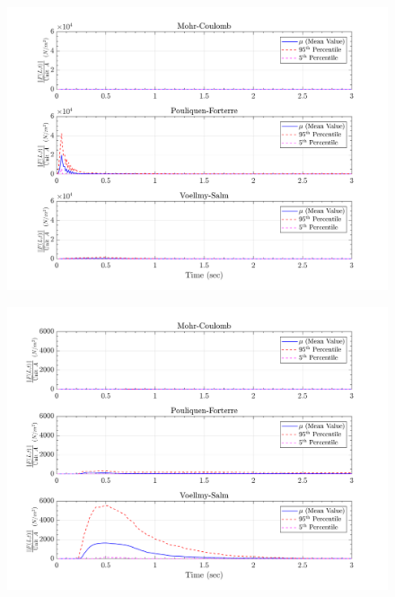 \documentclass{article}
\begin{document}
\begin{figure}[H]
	\begin{minipage}[b]{0.5\linewidth}
    	\centering
    	\includegraphics[width=1\textwidth]{InclinedPlane/LocalRecords/Records/Fr_L1.png}
    	\label{fig:Ramp-L1-Fr}
	\end{minipage}
	\begin{minipage}[b]{0.5\linewidth}
		\centering
		\includegraphics[width=1\textwidth]{InclinedPlane/LocalRecords/Records/Fr_L8.png}
    	\label{fig:Ramp-L2-Fr}
    \end{minipage}


\end{figure}
\end{document}
